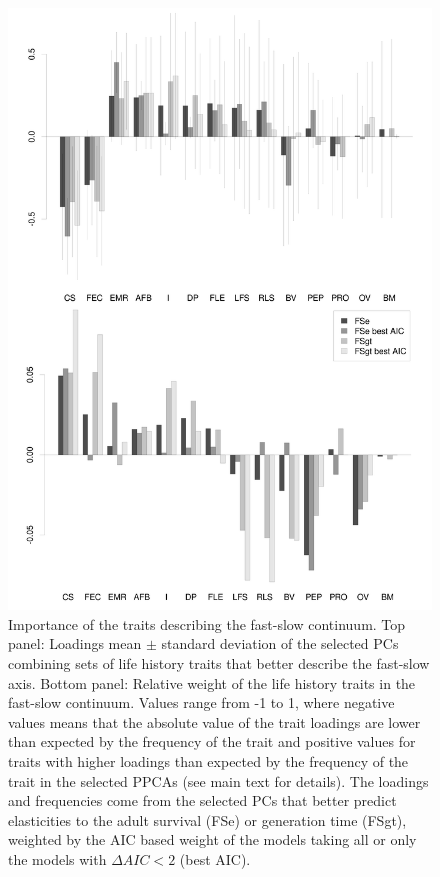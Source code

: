 \begin{figure}
\centering
\includegraphics[width=\textwidth]{./Figures/chapter02/fig2-FSaxes.png}
\caption[Fast-Slow PC loadings]{
Importance of the traits describing the fast-slow continuum. Top panel: Loadings 
mean $\pm$ standard deviation of the selected PCs combining sets of life history
traits that better describe the fast-slow axis. Bottom panel: Relative weight
of the life history traits in the fast-slow continuum. Values range from -1 to
1, where negative values means that the absolute value of the trait loadings are
lower than expected by the frequency of the trait and positive values for traits
with higher loadings than expected by the frequency of the trait in the
selected PPCAs (see main text for details). The loadings and frequencies come
from the selected PCs that better predict elasticities to the adult survival
(FSe) or generation time (FSgt), weighted by the AIC based weight of the models
taking all or only the models with $\Delta AIC < 2$ (best AIC).}
\label{fig:fig2.2}
\end{figure}


